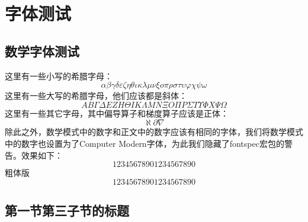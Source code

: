 
\section{字体测试}

\zhlipsum[1]

\subsection{数学字体测试}

这里有一些小写的希腊字母：
\begin{equation}
  \alpha \beta \gamma \delta \varepsilon \zeta \eta \theta \iota \kappa \lambda \mu \nu \xi o \pi \rho \sigma \tau \upsilon \varphi \chi \psi \omega
\end{equation}
这里有一些大写的希腊字母，他们应该都是斜体：
\begin{equation}
  A B \Gamma \Delta E Z H \Theta I K \Lambda M N \Xi O \Pi P \Sigma T \Upsilon \varPhi X \Psi \Omega
\end{equation}
这里有一些其它字母，其中偏导算子和梯度算子应该是正体：
\begin{equation}
  \aleph \partial \nabla
\end{equation}
除此之外，数学模式中的数字和正文中的数字应该有相同的字体，我们将数学模式中的数字也设置为了Computer Modern字体，为此我们隐藏了fontspec宏包的警告。效果如下：
\begin{equation}
  1234567890\text{1234567890}
\end{equation}
粗体版{\bf
  \begin{equation}
    1234567890\text{1234567890}
  \end{equation}
}

\subsection{第一节第三子节的标题}

\zhlipsum
